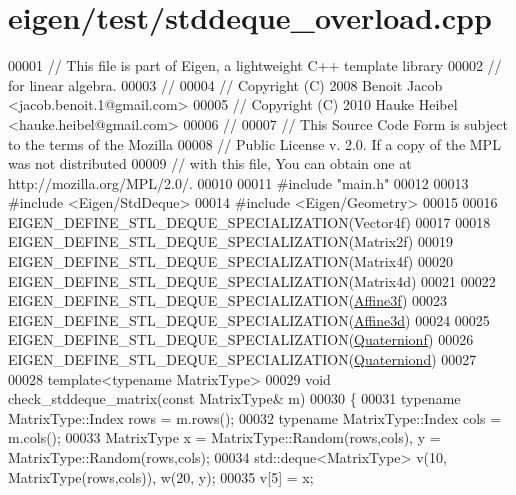 \hypertarget{eigen_2test_2stddeque__overload_8cpp_source}{}\section{eigen/test/stddeque\+\_\+overload.cpp}
\label{eigen_2test_2stddeque__overload_8cpp_source}

\begin{DoxyCode}
00001 \textcolor{comment}{// This file is part of Eigen, a lightweight C++ template library}
00002 \textcolor{comment}{// for linear algebra.}
00003 \textcolor{comment}{//}
00004 \textcolor{comment}{// Copyright (C) 2008 Benoit Jacob <jacob.benoit.1@gmail.com>}
00005 \textcolor{comment}{// Copyright (C) 2010 Hauke Heibel <hauke.heibel@gmail.com>}
00006 \textcolor{comment}{//}
00007 \textcolor{comment}{// This Source Code Form is subject to the terms of the Mozilla}
00008 \textcolor{comment}{// Public License v. 2.0. If a copy of the MPL was not distributed}
00009 \textcolor{comment}{// with this file, You can obtain one at http://mozilla.org/MPL/2.0/.}
00010 
00011 \textcolor{preprocessor}{#include "main.h"}
00012 
00013 \textcolor{preprocessor}{#include <Eigen/StdDeque>}
00014 \textcolor{preprocessor}{#include <Eigen/Geometry>}
00015 
00016 EIGEN\_DEFINE\_STL\_DEQUE\_SPECIALIZATION(Vector4f)
00017 
00018 EIGEN\_DEFINE\_STL\_DEQUE\_SPECIALIZATION(Matrix2f)
00019 EIGEN\_DEFINE\_STL\_DEQUE\_SPECIALIZATION(Matrix4f)
00020 EIGEN\_DEFINE\_STL\_DEQUE\_SPECIALIZATION(Matrix4d)
00021 
00022 EIGEN\_DEFINE\_STL\_DEQUE\_SPECIALIZATION(\hyperlink{group___geometry___module_class_eigen_1_1_transform}{Affine3f})
00023 EIGEN\_DEFINE\_STL\_DEQUE\_SPECIALIZATION(\hyperlink{group___geometry___module_class_eigen_1_1_transform}{Affine3d})
00024 
00025 EIGEN\_DEFINE\_STL\_DEQUE\_SPECIALIZATION(\hyperlink{group___geometry___module_class_eigen_1_1_quaternion}{Quaternionf})
00026 EIGEN\_DEFINE\_STL\_DEQUE\_SPECIALIZATION(\hyperlink{group___geometry___module_class_eigen_1_1_quaternion}{Quaterniond})
00027 
00028 \textcolor{keyword}{template}<\textcolor{keyword}{typename} MatrixType>
00029 \textcolor{keywordtype}{void} check\_stddeque\_matrix(\textcolor{keyword}{const} MatrixType& m)
00030 \{
00031   \textcolor{keyword}{typename} MatrixType::Index rows = m.rows();
00032   \textcolor{keyword}{typename} MatrixType::Index cols = m.cols();
00033   MatrixType x = MatrixType::Random(rows,cols), y = MatrixType::Random(rows,cols);
00034   std::deque<MatrixType> v(10, MatrixType(rows,cols)), w(20, y);
00035   v[5] = x;

\end{DoxyCode}
